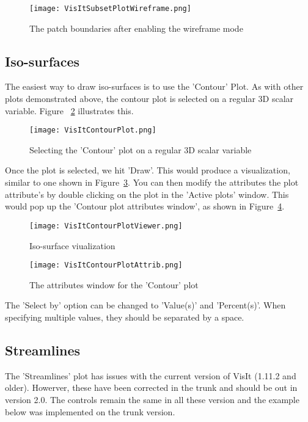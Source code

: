 \begin{figure}
  \center
  \texttt{[image: VisItSubsetPlotWireframe.png]}
  \caption{The patch boundaries after enabling the wireframe mode}
  \label{VisItSubsetPlotWireframe}
\end{figure}

\subsection{Iso-surfaces}

The easiest way to draw iso-surfaces is to use the 'Contour' Plot. As with other plots demonstrated above, the contour plot is selected on a regular 3D scalar variable. Figure ~\ref{VisItContourPlot} illustrates this. 

\begin{figure}
  \center
  \texttt{[image: VisItContourPlot.png]}
  \caption{Selecting the 'Contour' plot on a regular 3D scalar variable}
  \label{VisItContourPlot}
\end{figure}

Once the plot is selected, we hit 'Draw'. This would produce a visualization, similar to one shown in Figure~\ref{VisItContourPlotViewer}. You can then modify the attributes the plot attribute's by double clicking on the plot in the 'Active plots' window. This would pop up the 'Contour plot attributes window', as shown in Figure~\ref{VisItContourPlotAttrib}. 

\begin{figure}
  \center
  \texttt{[image: VisItContourPlotViewer.png]}
  \caption{Iso-surface viualization}
  \label{VisItContourPlotViewer}
\end{figure}

\begin{figure}
  \center
  \texttt{[image: VisItContourPlotAttrib.png]}
  \caption{The attributes window for the 'Contour' plot}
  \label{VisItContourPlotAttrib}
\end{figure}

The 'Select by' option can be changed to 'Value(s)' and 'Percent(s)'. When specifying multiple values, they should be separated by a space.

\subsection{Streamlines}

The 'Streamlines' plot has issues with the current version of VisIt (1.11.2 and older). Howerver, these have been corrected in the trunk and should be out in version 2.0. The controls remain the same in all these version and the example below was implemented on the trunk version.

